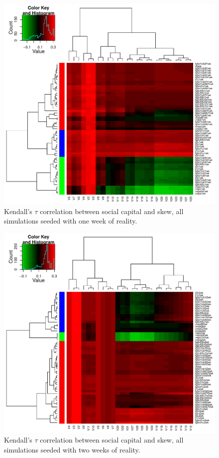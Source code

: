 \documentclass[10pt,oneside]{memoir}
\begin{document}
\begin{Spacing}{2}
\begin{figure}
\begin{center}
    \includegraphics{figures/crop/heatmap-cstau-1wk}
    \caption{Kendall’s $\tau$ correlation between social capital and skew, all simulations seeded with one week of reality.}
    \label{figure:heatmap-cstau-1wk}
\end{center}
\end{figure}

\begin{figure}
\begin{center}
    \includegraphics{figures/crop/heatmap-cstau-2wk}
    \caption{Kendall’s $\tau$ correlation between social capital and skew, all simulations seeded with two weeks of reality.}
    \label{figure:heatmap-cstau-2wk}
\end{center}
\end{figure}


\end{Spacing}
\end{document}
